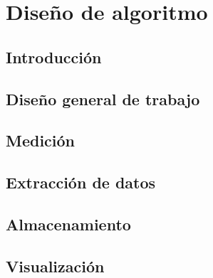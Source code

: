 \chapter{Diseño de algoritmo}
\section{Introducción}
\section{Diseño general de trabajo}
\section{Medición}
\section{Extracción de datos}
\section{Almacenamiento}
\section{Visualización}